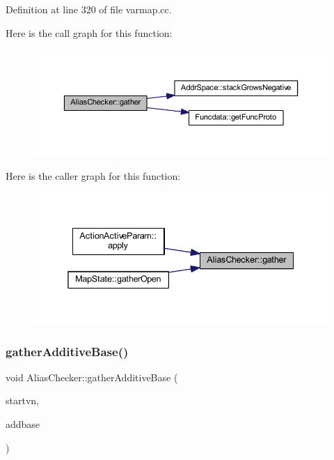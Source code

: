 Definition at line 320 of file varmap.\+cc.

Here is the call graph for this function\+:
\nopagebreak
\begin{figure}[H]
\begin{center}
\leavevmode
\includegraphics[width=350pt]{class_alias_checker_a66092e26df7c31f66bb375abc184a490_cgraph}
\end{center}
\end{figure}
Here is the caller graph for this function\+:
\nopagebreak
\begin{figure}[H]
\begin{center}
\leavevmode
\includegraphics[width=338pt]{class_alias_checker_a66092e26df7c31f66bb375abc184a490_icgraph}
\end{center}
\end{figure}
\mbox{\label{class_alias_checker_a3a5fa2b60bb9d039a77105a26a04604d}} 
\subsubsection{\texorpdfstring{gatherAdditiveBase()}{gatherAdditiveBase()}}
{\footnotesize\ttfamily void Alias\+Checker\+::gather\+Additive\+Base (\begin{DoxyParamCaption}\item[{\mbox{\hyperlink{class_varnode}{Varnode}} $\ast$}]{startvn,  }\item[{vector$<$ \mbox{\hyperlink{struct_alias_checker_1_1_add_base}{Add\+Base}} $>$ \&}]{addbase }\end{DoxyParamCaption})\hspace{0.3cm}{\ttfamily [static]}}



